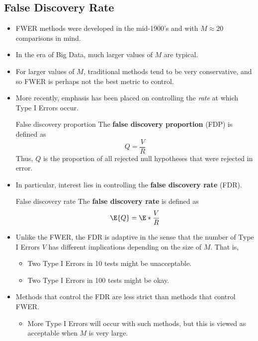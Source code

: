 \subsection{False Discovery Rate}
\begin{itemize}
      \item FWER methods were developed in the mid-1900's and with $ M\approx 20 $ comparisons in mind.
      \item In the era of Big Data, much larger values of $M$ are typical.
      \item For larger values of $M$, traditional methods tend to be very conservative, and so FWER is perhaps
            not the best metric to control.
      \item More recently, emphasis has been placed on controlling the \emph{rate} at which Type I Errors occur.
            \begin{Definition}{False discovery proportion}{}
                  The \textbf{false discovery proportion} (FDP) is defined as
                  \[ Q=\frac{V}{R} \]
                  Thus, $ Q $ is the proportion of all rejected null hypotheses that were rejected
                  in error.
            \end{Definition}
      \item In particular, interest lies in controlling the \textbf{false discovery rate} (FDR).
            \begin{Definition}{False discovery rate}{}
                  The \textbf{false discovery rate} is defined as
                  \[ \E{Q}=\E*{\frac{V}{R}} \]
            \end{Definition}
      \item Unlike the FWER, the FDR is adaptive in the sense that the number of Type I Errors $V$ has different
            implications depending on the size of $M$. That is,
            \begin{itemize}
                  \item Two Type I Errors in 10 tests might be unacceptable.
                  \item Two Type I Errors in 100 tests might be okay.
            \end{itemize}
      \item Methods that control the FDR are less strict than methods that control FWER\@.
            \begin{itemize}
                  \item More Type I Errors will occur with such methods, but this is viewed as acceptable when $M$ is
                        very large.
            \end{itemize}
\end{itemize}
